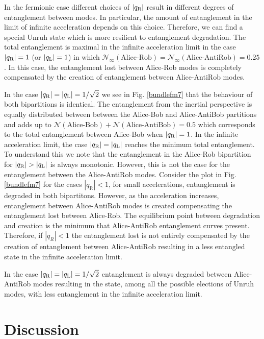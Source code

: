  In the fermionic case different choices of $|q_\text{\text{R}}|$ result in different degrees of entanglement between modes. In particular, the amount of entanglement in the limit of infinite acceleration depends on this choice. Therefore, we can find a special Unruh state which is more resilient  to entanglement degradation. The total entanglement is maximal in the infinite acceleration limit in the case $|q_\text{\text{R}}|=1$ (or $|q_\text{\text{L}}|=1$) in which  $\mathcal{N}_{\infty}(\text{Alice-Rob})=\mathcal{N}_{\infty}(\text{Alice-AntiRob})=0.25$.  In this case, the entanglement lost between Alice-Rob modes is completely compensated by the creation of entanglement between Alice-AntiRob modes.


In the case $|q_\text{\text{R}}|=|q_\text{\text{L}}|=1/\sqrt2$ we see in Fig. \ref{bundlefm7} that the behaviour of both bipartitions is identical. The entanglement from the inertial perspective is equally distributed between between the Alice-Bob and Alice-AntiBob partitions and adds up to
$\mathcal{N}(\text{Alice-Bob})+\mathcal{N}(\text{Alice-AntiBob}) = 0.5$ which corresponds to the total entanglement
between Alice-Bob when $|q_\text{\text{R}}|=1$. In the infinite acceleration limit, the case $|q_\text{\text{R}}|=|q_\text{\text{L}}|$ reaches the minimum total entanglement.   To understand this we note that the entanglement in the Alice-Rob bipartition for  $|q_\text{\text{R}}|>|q_\text{\text{L}}|$ is always monotonic. However, this is not the case for the entanglement between the Alice-AntiRob modes.  Consider the plot in Fig. \ref{bundlefm7} for the cases $|q_\text{R}|<1$,  for small accelerations, entanglement is degraded in both bipartitons.  However, as the acceleration increases, entanglement between Alice-AntiRob modes is created compensating the entanglement lost between Alice-Rob. The equilibrium point between degradation and creation  is the minimum  that Alice-AntiRob entanglement curves present. Therefore, if $|q_R|<1$ the entanglement lost is not entirely compensated by the creation of entanglement between Alice-AntiRob resulting in a less entangled state in the infinite acceleration limit. 

 In the case $|q_\text{\text{R}}|=|q_\text{\text{L}}|=1/\sqrt2$ entanglement is always degraded between Alice-AntiRob modes resulting in the state, among all the possible elections of Unruh modes,  with less entanglement in the infinite acceleration limit.



\section{Discussion}\label{conclusions}

